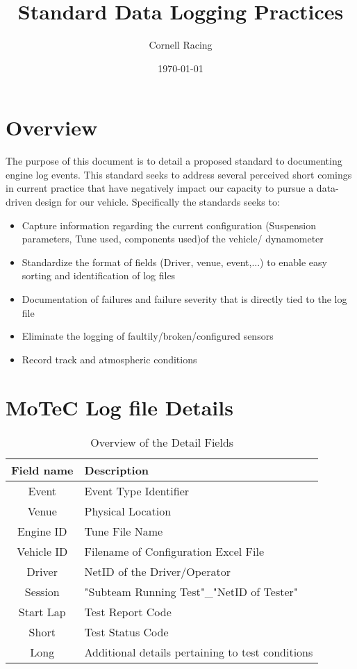 \documentclass{article}
\begin{document}
\title{Standard Data Logging Practices}
\author{Cornell Racing}
\date{\today}
\maketitle

\section{Overview}
The purpose of this document is to detail a proposed standard to documenting engine log events.
This standard seeks to address several perceived short comings in current practice that have negatively impact our capacity to pursue a data-driven design for our vehicle.
Specifically the standards seeks to:

\begin{itemize}
	\item Capture information regarding the current configuration (Suspension parameters, Tune used, components used)of the vehicle/ dynamometer
	\item Standardize the format of fields (Driver, venue, event,...) to enable easy sorting and identification of log files
	\item Documentation of failures and failure severity that is directly tied to the log file
	\item Eliminate the logging of faultily/broken/configured sensors
	\item Record track and atmospheric conditions
\end{itemize}

\section{MoTeC Log file Details}

\begin{table}[h]
\centering
\caption{Overview of the Detail Fields}
\label{tab:DetailOver}
\begin{tabular}{cl}
Field name               	& Description                                    	\\\hline
Event                    	& Event Type Identifier                          	\\
Venue                    	& Physical Location                              	\\
Engine ID                	& Tune File Name                                 	\\
Vehicle ID               	& Filename of Configuration Excel File           	\\
Driver                   	& NetID of the Driver/Operator                   	\\
Session                  	& "Subteam Running Test"\_"NetID of Tester"      	\\
Start Lap                	& Test Report Code                               	\\
Short                  	  	& Test Status Code                               	\\
Long						& Additional details pertaining to test conditions  \\\hline
\end{tabular}
\end{table}
\end{document}
